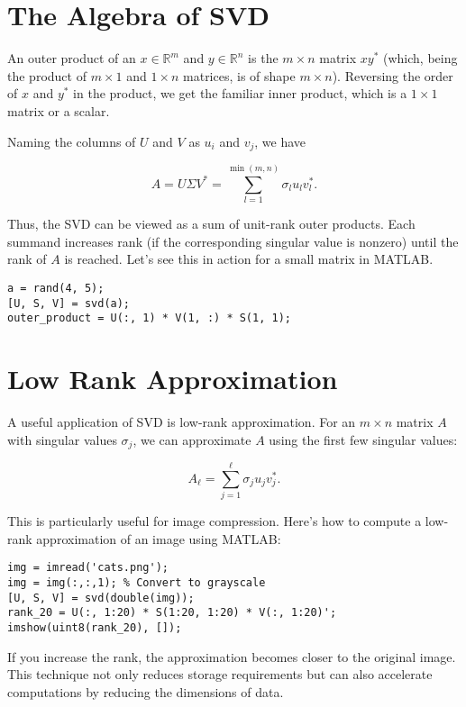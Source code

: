 \documentclass{ximera}
\begin{document}
\begin{problem}
\begin{problem}
\section{The Algebra of SVD}

An outer product of an \( x \in \mathbb{R}^m \) and \( y \in \mathbb{R}^n \) is the \( m \times n \) matrix \( x y^* \) (which, being the product of \( m \times 1 \) and \( 1 \times n \) matrices, is of shape \( m \times n \)). Reversing the order of \( x \) and \( y^* \) in the product, we get the familiar inner product, which is a \( 1 \times 1 \) matrix or a scalar.

Naming the columns of \( U \) and \( V \) as \( u_i \) and \( v_j \), we have

\[
A = U \Sigma V^* = \sum_{l=1}^{\min(m,n)} \sigma_l u_l v_l^*.
\]

Thus, the SVD can be viewed as a sum of unit-rank outer products. Each summand increases rank (if the corresponding singular value is nonzero) until the rank of \( A \) is reached. Let's see this in action for a small matrix in MATLAB.

\begin{verbatim}
a = rand(4, 5);
[U, S, V] = svd(a);
outer_product = U(:, 1) * V(1, :) * S(1, 1);
\end{verbatim}

\section{Low Rank Approximation}

A useful application of SVD is low-rank approximation. For an \( m \times n \) matrix \( A \) with singular values \( \sigma_j \), we can approximate \( A \) using the first few singular values:

\[
A_\ell = \sum_{j=1}^\ell \sigma_j u_j v_j^*.
\]

This is particularly useful for image compression. Here’s how to compute a low-rank approximation of an image using MATLAB:

\begin{verbatim}
img = imread('cats.png');
img = img(:,:,1); % Convert to grayscale
[U, S, V] = svd(double(img));
rank_20 = U(:, 1:20) * S(1:20, 1:20) * V(:, 1:20)';
imshow(uint8(rank_20), []);
\end{verbatim}

If you increase the rank, the approximation becomes closer to the original image. This technique not only reduces storage requirements but can also accelerate computations by reducing the dimensions of data.


\end{problem}
\end{problem}
\end{document}
